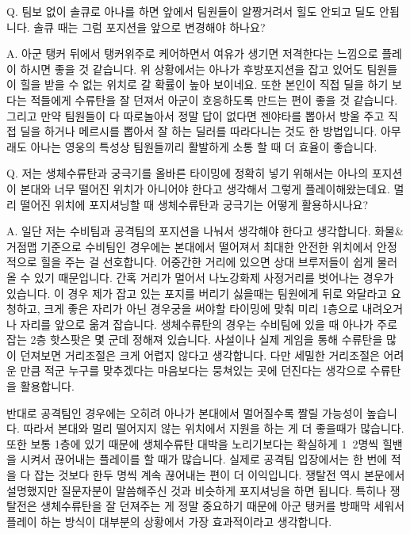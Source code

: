  

 

Q. 팀보 없이 솔큐로 아나를 하면 앞에서 팀원들이 알짱거려서 힐도 안되고 딜도 안됩니다. 솔큐 때는 그럼 포지션을 앞으로 변경해야 하나요?

 

A. 아군 탱커 뒤에서 탱커위주로 케어하면서 여유가 생기면 저격한다는 느낌으로 플레이 하시면 좋을 것 같습니다. 위 상황에서는 아나가 후방포지션을 잡고 있어도 팀원들이 힐을 받을 수 없는 위치로 갈 확률이 높아 보이네요. 또한 본인이 직접 딜을 하기 보다는 적들에게 수류탄을 잘 던져서 아군이 호응하도록 만드는 편이 좋을 것 같습니다. 그리고 만약 팀원들이 다 따로놀아서 정말 답이 없다면 젠야타를 뽑아서 방울 주고 직접 딜을 하거나 메르시를 뽑아서 잘 하는 딜러를 따라다니는 것도 한 방법입니다. 아무래도 아나는 영웅의 특성상 팀원들끼리 활발하게 소통 할 때 더 효율이 좋습니다.

 

 

Q. 저는 생체수류탄과 궁극기를 올바른 타이밍에 정확히 넣기 위해서는 아나의 포지션이 본대와 너무 떨어진 위치가 아니어야 한다고 생각해서 그렇게 플레이해왔는데요. 멀리 떨어진 위치에 포지셔닝할 때 생체수류탄과 궁극기는 어떻게 활용하시나요?

 

A. 일단 저는 수비팀과 공격팀의 포지션을 나눠서 생각해야 한다고 생각합니다. 화물&거점맵 기준으로 수비팀인 경우에는 본대에서 떨어져서 최대한 안전한 위치에서 안정적으로 힐을 주는 걸 선호합니다. 어중간한 거리에 있으면 상대 브루저들이 쉽게 물러올 수 있기 때문입니다. 간혹 거리가 멀어서 나노강화제 사정거리를 벗어나는 경우가 있습니다. 이 경우 제가 잡고 있는 포지를 버리기 싫을때는 팀원에게 뒤로 와달라고 요청하고, 크게 좋은 자리가 아닌 경우궁을 써야할 타이밍에 맞춰 미리 1층으로 내려오거나 자리를 앞으로 옮겨 잡습니다. 생체수류탄의 경우는 수비팀에 있을 때 아나가 주로 잡는 2층 핫스팟은 몇 군데 정해져 있습니다. 사설이나 실제 게임을 통해 수류탄을 많이 던져보면 거리조절은 크게 어렵지 않다고 생각합니다. 다만 세밀한 거리조절은 어려운 만큼 적군 누구를 맞추겠다는 마음보다는 뭉쳐있는 곳에 던진다는 생각으로 수류탄을 활용합니다.

 

반대로 공격팀인 경우에는 오히려 아나가 본대에서 멀어질수록 짤릴 가능성이 높습니다. 따라서 본대와 멀리 떨어지지 않는 위치에서 지원을 하는 게 더 좋을때가 많습니다. 또한 보통 1층에 있기 때문에 생체수류탄 대박을 노리기보다는 확실하게 1~2명씩 힐밴을 시켜서 끊어내는 플레이를 할 때가 많습니다. 실제로 공격팀 입장에서는 한 번에 적을 다 잡는 것보다 한두 명씩 계속 끊어내는 편이 더 이익입니다. 쟁탈전 역시 본문에서 설명했지만 질문자분이 말씀해주신 것과 비슷하게 포지셔닝을 하면 됩니다. 특히나 쟁탈전은 생체수류탄을 잘 던져주는 게 정말 중요하기 때문에 아군 탱커를 방패막 세워서 플레이 하는 방식이 대부분의 상황에서 가장 효과적이라고 생각합니다.

